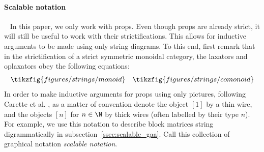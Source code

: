 \paragraph{Scalable notation} \  \newline
In this paper, we only work with props.  Even though props are already strict, it will still be useful to work with their strictifications.
This allows for inductive arguments to be made using only string diagrams.  To this end, first remark that in the strictification of a strict symmetric monoidal category, the laxators and oplaxators obey the following equations:
\begin{equation}
  \label{eq:scalablemonoid}
  \tikzfig{figures/strings/monoid}
    \quad
  \tikzfig{figures/strings/comonoid}
\end{equation}
In order to make inductive arguments for props using only pictures, following Carette et al. \cite{carette_szx-calculus_2019, carette_note_2020, carette2022large-scale_2022}, as a matter of convention denote the object \([1]\) by a thin wire, and the objects \([n]\) for \(n \in \N\) by thick wires (often labelled by their type \(n\)).
For example, we use this notation to describe block matrices string digrammatically in subsection~\ref{ssec:scalable_gaa}.
Call this collection of graphical notation {\em scalable notation}.

